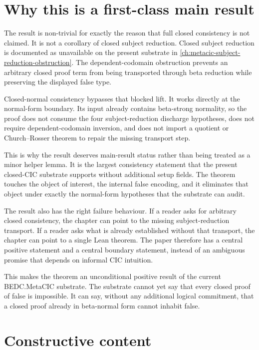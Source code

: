 \section{Why this is a first-class main result}
\label{sec:closed-normal-consistency-main-result-first-class}

The result is non-trivial for exactly the reason that full closed consistency
is not claimed. It is not a corollary of closed subject reduction. Closed
subject reduction is documented as unavailable on the present substrate in
\autoref{ch:metacic-subject-reduction-obstruction}. The dependent-codomain
obstruction prevents an arbitrary closed proof term from being transported
through beta reduction while preserving the displayed false type.

Closed-normal consistency bypasses that blocked lift. It works directly at the
normal-form boundary. Its input already contains beta-strong normality, so the
proof does not consume the four subject-reduction discharge hypotheses, does
not require dependent-codomain inversion, and does not import a quotient or
Church--Rosser theorem to repair the missing transport step.

This is why the result deserves main-result status rather than being treated as
a minor helper lemma. It is the largest consistency statement that the present
closed-CIC substrate supports without additional setup fields. The theorem
touches the object of interest, the internal false encoding, and it eliminates
that object under exactly the normal-form hypotheses that the substrate can
audit.

The result also has the right failure behaviour. If a reader asks for arbitrary
closed consistency, the chapter can point to the missing subject-reduction
transport. If a reader asks what is already established without that transport,
the chapter can point to a single Lean theorem. The paper therefore has a
central positive statement and a central boundary statement, instead of an
ambiguous promise that depends on informal CIC intuition.

This makes the theorem an unconditional positive result of the current
BEDC.MetaCIC substrate. The substrate cannot yet say that every closed proof of
false is impossible. It can say, without any additional logical commitment,
that a closed proof already in beta-normal form cannot inhabit false.

\section{Constructive content}
\label{sec:closed-normal-consistency-main-result-constructive}

